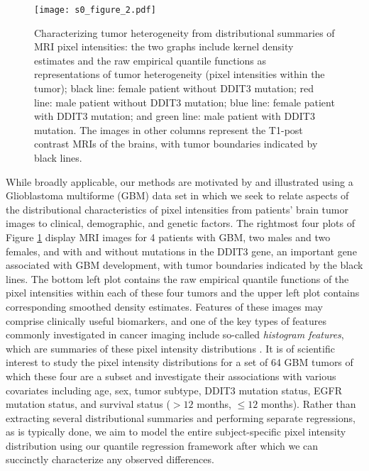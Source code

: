 \documentclass[11pt]{article}
\begin{document}
 \begin{figure}[!htb]
 \centering
 \caption{\small Characterizing tumor heterogeneity from distributional summaries of MRI pixel intensities: 
the two graphs include kernel density estimates and the raw empirical quantile functions as representations of tumor heterogeneity (pixel intensities within the tumor); black line: female patient without DDIT3 mutation; red line: male patient without DDIT3 mutation; blue line: female patient with DDIT3 mutation; and green line: male patient with DDIT3 mutation. The images in other columns represent the T1-post contrast MRIs of the brains, with tumor boundaries indicated by black lines. %
  \label{S5_Figure_Intro}}
\texttt{[image: s0\_figure\_2.pdf]}
\end{figure}

While broadly applicable, our methods are motivated by and illustrated using a Glioblastoma multiforme (GBM) data set %
in which we seek to relate aspects of the distributional characteristics of pixel intensities from patients' brain tumor images to clinical, demographic, and genetic factors.  The rightmost four plots of Figure \ref{S5_Figure_Intro} display MRI images for 4 patients with GBM, two males and two females, and with and without mutations in the DDIT3 gene, an important gene associated with GBM development, with tumor boundaries indicated by the black lines.  The bottom left plot contains the raw empirical quantile functions of the pixel intensities  within each of these four tumors and the upper left plot contains corresponding smoothed density estimates.  Features of these images may comprise clinically useful biomarkers, and one of the key types of features commonly investigated in cancer imaging include so-called \textit{histogram features}, which are summaries of these pixel intensity distributions \cite{just2014improving}.  It is of scientific interest to study the pixel intensity distributions for a set of 64 GBM tumors of which these four are a subset and investigate their associations with various covariates including age, sex, tumor subtype, DDIT3 mutation status, EGFR mutation status, and survival status ($>12$ months, $\le 12$ months).  Rather than extracting several distributional summaries and performing separate regressions, as is typically done, we aim to model the entire subject-specific pixel intensity distribution using our quantile regression framework after which we can succinctly characterize any observed differences.
\end{document}
